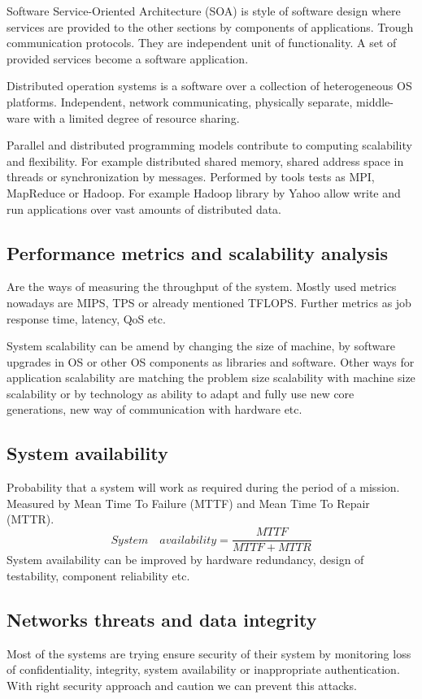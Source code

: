 \documentclass[12pt]{report}
\begin{document}
Software Service-Oriented Architecture (SOA) is style of software design where services are provided to the other sections by components of applications. Trough communication protocols. They are independent unit of functionality. A set of provided services become a software application.

Distributed operation systems is a software over a collection of heterogeneous OS platforms. Independent, network communicating, physically separate, middle-ware with a limited degree of resource sharing.

Parallel and distributed programming models contribute to computing scalability and flexibility. For example distributed shared memory, shared address space in threads or synchronization by messages. Performed by tools tests as MPI, MapReduce or Hadoop. For example Hadoop library by Yahoo allow write and run applications over vast amounts of distributed data.

\subsection*{Performance metrics and scalability analysis}
Are the ways of measuring the throughput of the system. Mostly used metrics nowadays are MIPS, TPS or already mentioned TFLOPS. Further metrics as job response time, latency, QoS etc.

System scalability can be amend by changing the size of machine, by software upgrades in OS or other OS components as libraries and software. Other ways for application scalability are matching the problem size scalability with machine size scalability or by technology as ability to adapt and fully use new core generations, new way of communication with hardware etc.

\subsection*{System availability} \label{MTTF}
Probability that a system will work as required during the period of a mission. Measured by Mean Time To Failure (MTTF) and Mean Time To Repair (MTTR).
\begin{equation}
System\quad availability = \frac{MTTF}{MTTF+MTTR}
\end{equation}
System availability can be improved by hardware redundancy, design of testability, component reliability etc.

\subsection*{Networks threats and data integrity}
Most of the systems are trying ensure security of their system by monitoring loss of confidentiality, integrity, system availability or inappropriate authentication. With right security approach and caution we can prevent this attacks.
\end{document}
